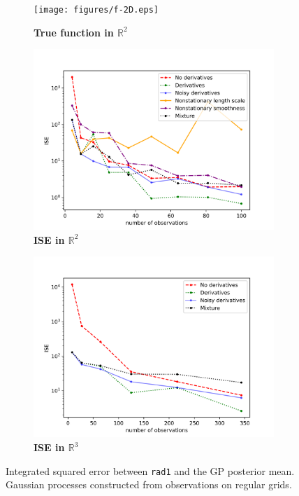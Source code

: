 \documentclass{article}
\newcommand{\R}{\mathbb{R}}
\numberwithin{equation}{section}
\begin{document}
\begin{figure}[H]
		\centering
		\captionsetup{justification=centering}
    \begin{subfigure}[t]{.33\textwidth}
      \centering
      \texttt{[image: figures/f-2D.eps]}
      \caption{\textbf{True function in $\R^2$}}
    \end{subfigure}%
    \begin{subfigure}[t]{.33\textwidth}
      \centering
      \includegraphics[scale=0.38]{figures/regular-2D-new.png}
      \caption{\textbf{ISE in $\R^2$}}
    \end{subfigure}
    \begin{subfigure}[t]{.33\textwidth}
      \centering
      \includegraphics[scale=0.38]{figures/regular-3D-new.png}
      \caption{\textbf{ISE in $\R^3$}}
    \end{subfigure}
		\caption{Integrated squared error between \texttt{rad1} and the GP posterior mean. Gaussian processes constructed from observations on regular grids.}
		\label{regular-2D}
\end{figure}
\end{document}

